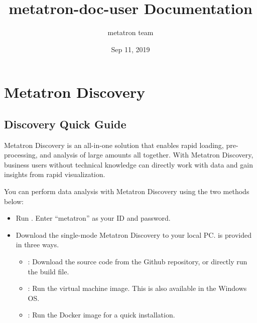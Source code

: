 \documentclass[letterpaper,10pt,english]{sphinxmanual}
\title{metatron-doc-user Documentation}
\date{Sep 11, 2019}
\author{metatron team}
\begin{document}
\pagestyle{empty}
\sphinxmaketitle
\pagestyle{plain}
\sphinxtableofcontents
\pagestyle{normal}
\label{\detokenize{index::doc}}



\part{Metatron Discovery}
\label{\detokenize{index:metatron-discovery}}

\chapter{Discovery Quick Guide}
\label{\detokenize{discovery/part00/index:id1}}\label{\detokenize{discovery/part00/index::doc}}
Metatron Discovery is an all-in-one solution that enables rapid loading, pre-processing, and analysis of large amounts all together. With Metatron Discovery, business users without technical knowledge can directly work with data and gain insights from rapid visualization.

You can perform data analysis with Metatron Discovery using the two methods below:
\begin{itemize}
\item {} 
 Run . Enter “metatron” as your ID and password.

\item {} 
 Download the single-mode Metatron Discovery to your local PC.  is provided in three ways.
\begin{itemize}
\item {} 
: Download the source code from the Github repository, or directly run the build file.

\item {} 
: Run the virtual machine image. This is also available in the Windows OS.

\item {} 
: Run the Docker image for a quick installation.

\end{itemize}

\end{itemize}
\end{document}
